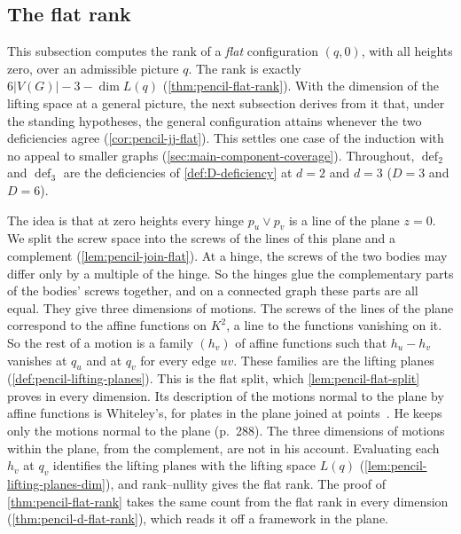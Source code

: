 \subsection{The flat rank}
\label{sec:main-component-flat}

This subsection computes the rank of a \emph{flat} configuration
$(q, 0)$, with all heights zero, over an admissible picture $q$. The rank
is exactly $6|V(G)| - 3 - \dim L(q)$ (\cref{thm:pencil-flat-rank}). With
the dimension of the lifting space at a general picture, the next
subsection derives from it that, under the standing hypotheses, the
general configuration attains whenever the two deficiencies agree
(\cref{cor:pencil-jj-flat}). This
settles one case of the induction with no appeal to smaller graphs
(\cref{sec:main-component-coverage}).
Throughout, $\operatorname{def}_2$ and $\operatorname{def}_3$ are the
deficiencies of \cref{def:D-deficiency} at $d = 2$ and $d = 3$ ($D = 3$
and $D = 6$).

The idea is that at zero heights every hinge $p_u \vee p_v$ is a line
of the plane $z = 0$. We split the screw space into the screws of the
lines of this plane and a complement (\cref{lem:pencil-join-flat}). At a
hinge, the screws of the two bodies may differ only by a multiple of the
hinge. So the hinges glue the complementary parts of the bodies' screws
together, and on a connected graph these parts are all equal. They give
three dimensions of motions. The screws of the lines of the plane
correspond to the affine functions on $K^2$, a line to the functions
vanishing on it. So the rest of a motion is a family $(h_v)$ of affine
functions such that $h_u - h_v$ vanishes at $q_u$ and at $q_v$ for every
edge $uv$. These families are the lifting planes
(\cref{def:pencil-lifting-planes}). This is the flat split, which
\cref{lem:pencil-flat-split} proves in every dimension. Its description of
the motions normal to the plane by affine functions is Whiteley's, for
plates in the plane joined at points~\cite[\S 5.1]{whiteley1984}. He
keeps only the motions normal to the plane (p.~288). The three
dimensions of motions within the plane, from the complement, are not in
his account. Evaluating each $h_v$ at $q_v$ identifies the lifting
planes with the lifting space $L(q)$
(\cref{lem:pencil-lifting-planes-dim}), and rank--nullity gives the flat
rank. The proof of \cref{thm:pencil-flat-rank} takes the same count from
the flat rank in every dimension (\cref{thm:pencil-d-flat-rank}), which
reads it off a framework in the plane.

